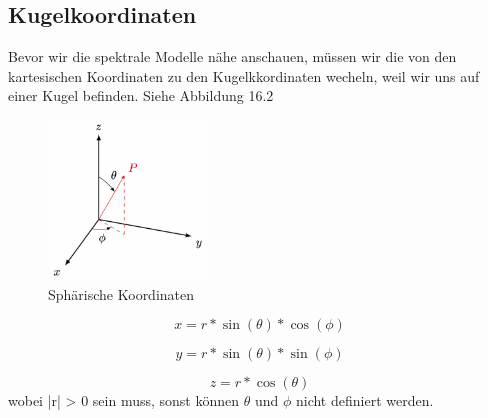 \subsection{Kugelkoordinaten
\label{spektral:subsection:kugelkoordinaten}}

Bevor wir die spektrale Modelle nähe anschauen, müssen wir die von den kartesischen Koordinaten zu den Kugelkkordinaten wecheln, weil wir uns auf einer Kugel befinden. Siehe Abbildung 16.2

\begin{figure}[h]
	\centering
	\includegraphics[height=120pt,width=120pt]{papers/spektral/images/spherical_coordinates.png}
	\caption{Sphärische Koordinaten}
    \label{spektral:fig:sphericalcoords}
\end{figure}
\pagebreak
\begin{equation}
 x = r*\sin(\theta)*\cos(\phi)
\label{spektral:equation4}
\end{equation}

\begin{equation}
 y = r*\sin(\theta)*\sin(\phi)
\label{spektral:equation5}
\end{equation}

\begin{equation}
 z = r*\cos(\theta)
\label{spektral:equation6}
\end{equation}
wobei |r| > 0 sein muss, sonst können $\theta$ und $\phi$ nicht definiert werden.


